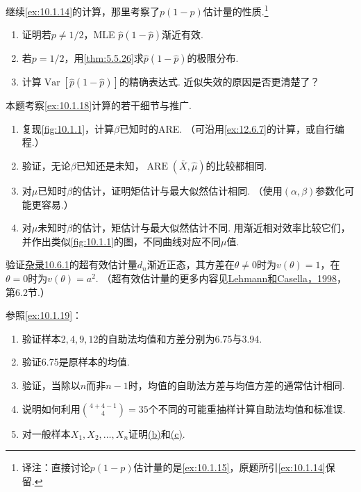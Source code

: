 \begin{exercise}\label{exercise:10.10}
继续\autoref{ex:10.1.14}的计算，那里考察了$p(1-p)$估计量的性质.\footnote{译注：直接讨论$p(1-p)$估计量的是\autoref{ex:10.1.15}，原题所引\autoref{ex:10.1.14}保留.}
\begin{enumerate}[label=(\alph*)]
\item 证明若$p\ne1/2$，MLE $\hat p(1-\hat p)$渐近有效.
\item 若$p=1/2$，用\autoref{thm:5.5.26}求$\hat p(1-\hat p)$的极限分布.
\item 计算$\operatorname{Var}[\hat p(1-\hat p)]$的精确表达式. 近似失效的原因是否更清楚了？
\end{enumerate}
\end{exercise}

\begin{exercise}\label{exercise:10.11}
本题考察\autoref{ex:10.1.18}计算的若干细节与推广.
\begin{enumerate}[label=(\alph*)]
\item 复现\autoref{fig:10.1.1}，计算$\beta$已知时的ARE. （可沿用\autoref{ex:12.6.7}的计算，或自行编程.）
\item 验证，无论$\beta$已知还是未知，$\operatorname{ARE}(\bar X,\hat\mu)$的比较都相同.
\item 对$\mu$已知时$\beta$的估计，证明矩估计与最大似然估计相同. （使用$(\alpha,\beta)$参数化可能更容易.）
\item 对$\mu$未知时$\beta$的估计，矩估计与最大似然估计不同. 用渐近相对效率比较它们，并作出类似\autoref{fig:10.1.1}的图，不同曲线对应不同$\mu$值.
\end{enumerate}
\end{exercise}

\begin{exercise}\label{exercise:10.12}
验证\hyperref[sec:10.6.1]{杂录10.6.1}的超有效估计量$d_n$渐近正态，其方差在$\theta\ne0$时为$v(\theta)=1$，在$\theta=0$时为$v(\theta)=a^2$. （超有效估计量的更多内容见\hyperref[bib:source200]{Lehmann和Casella，1998}，第6.2节.）
\end{exercise}

\begin{exercise}\label{exercise:10.13}
参照\autoref{ex:10.1.19}：
\begin{enumerate}[label=(\alph*)]
\item 验证样本$2,4,9,12$的自助法均值和方差分别为6.75与3.94.
\item\label{item:10.13.b} 验证6.75是原样本的均值.
\item\label{item:10.13.c} 验证，当除以$n$而非$n-1$时，均值的自助法方差与均值方差的通常估计相同.
\item 说明如何利用$\binom{4+4-1}{4}=35$个不同的可能重抽样计算自助法均值和标准误.
\item 对一般样本$X_1,X_2,\ldots,X_n$证明\hyperref[item:10.13.b]{(b)}和\hyperref[item:10.13.c]{(c)}.
\end{enumerate}
\end{exercise}

